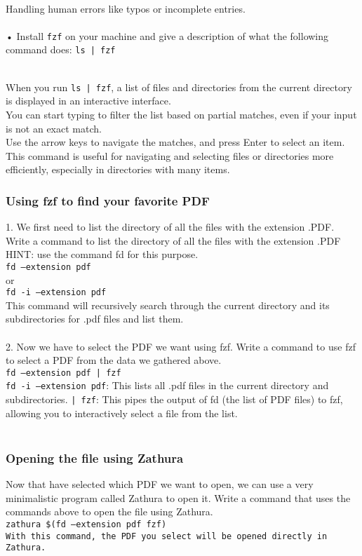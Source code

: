 \documentclass[a4paper,12pt]{article}
\begin{document}
\\Handling human errors like typos or incomplete entries.
\\
\\• Install \texttt{fzf} on your machine and give a description of what the following command does: 
\texttt{ls | fzf}

\\When you run \texttt{ls | fzf}, a list of files and directories from the current directory is displayed in an interactive interface.
\\You can start typing to filter the list based on partial matches, even if your input is not an exact match.
\\Use the arrow keys to navigate the matches, and press Enter to select an item.
\\This command is useful for navigating and selecting files or directories more efficiently, especially in directories with many items.
\subsubsection{Using fzf to find your favorite PDF}
1. We first need to list the directory of all the files with the extension .PDF. Write a
command to list the directory of all the files with the extension .PDF
HINT: use the command fd for this purpose.
\\\texttt{fd --extension pdf}
\\or
\\\texttt{fd -i --extension pdf}
\\This command will recursively search through the current directory and its subdirectories for .pdf files and list them.
\\
\\2. Now we have to select the PDF we want using fzf. Write a command to use fzf to
select a PDF from the data we gathered above.
\\\texttt{fd --extension pdf | fzf}
\\\texttt{fd -i --extension pdf}: This lists all .pdf files in the current directory and subdirectories.
\texttt{| fzf}: This pipes the output of fd (the list of PDF files) to fzf, allowing you to interactively select a file from the list.
\\
\\
\subsubsection{Opening the file using Zathura}
Now that have selected which PDF we want to open, we can use a very minimalistic
program called Zathura to open it. Write a command that uses the commands above to
open the file using Zathura.
\\\texttt{zathura \$(fd --extension pdf \mid fzf)}
\\\texttt{With this command, the PDF you select will be opened directly in Zathura.}
\end{document}
